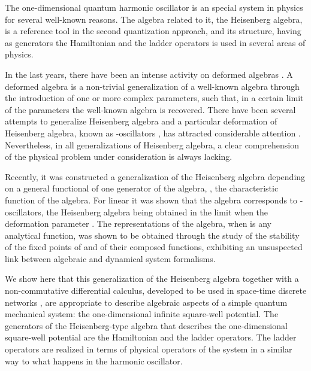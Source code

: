 \documentclass[a4paper,12pt]{article}
\begin{document}
\newpage



The one-dimensional quantum harmonic oscillator is an
special system in physics for several well-known reasons. 
The algebra related to it, the Heisenberg algebra, is a 
reference tool in the second quantization approach, and 
its structure, having as generators the Hamiltonian and  
the ladder operators is used in several areas of
physics. 

In the last years, there have been an intense activity
on deformed algebras \cite{defalgebras}. A deformed algebra
is a non-trivial generalization of a well-known algebra
through the introduction of one or more complex parameters,
such that, in a certain limit of the parameters the 
well-known algebra is recovered. There have been 
several attempts to generalize Heisenberg algebra and a 
particular deformation of Heisenberg algebra, known as
\coordHE{}-oscillators \cite{qoscillators}, has attracted 
considerable attention \cite{qappli,marco1, marco2}. 
Nevertheless, in all generalizations of Heisenberg algebra, 
a clear comprehension of the physical problem under 
consideration is always lacking.

Recently, it was constructed a generalization of 
the Heisenberg algebra depending on a general functional 
of one generator of the algebra, \coordHE{}, 
\cite{algebra1,algebra2} the characteristic function
of the algebra. For linear \coordHE{} it was shown 
that the algebra corresponds to \coordHE{}-oscillators, 
the Heisenberg algebra being obtained in the limit when 
the deformation parameter \coordHE{}. The 
representations of the algebra, when \coordHE{} is any 
analytical function, was shown to be obtained through
the study of the stability of the fixed points of \coordHE{} and 
of their composed functions, exhibiting an unsuspected 
link between algebraic and dynamical system formalisms.

We show here that this generalization of the Heisenberg
algebra together with a non-commutative differential 
calculus, developed to be used in space-time discrete 
networks \cite{dimakis1,dimakis2,dimakis3}, are 
appropriate to describe algebraic aspects of a simple 
quantum mechanical system: the one-dimensional infinite 
square-well potential. The generators of the 
Heisenberg-type algebra that describes the one-dimensional
square-well potential are the Hamiltonian and the
ladder operators. The ladder operators are realized in 
terms of physical operators of the system in a similar 
way to what happens in the harmonic oscillator. 
\end{document}
